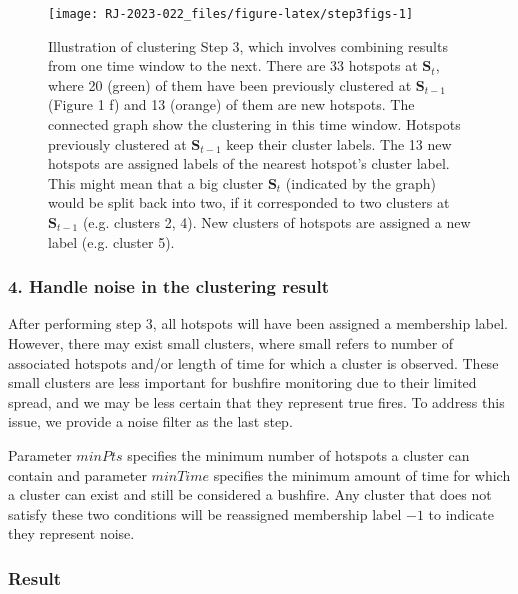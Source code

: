 \begin{figure}

{\centering \texttt{[image: RJ-2023-022\_files/figure-latex/step3figs-1]} 

}

\caption{Illustration of clustering Step 3, which involves combining results from one time window to the next. There are 33 hotspots at $\boldsymbol{S}_t$, where 20 (green) of them have been previously clustered at $\boldsymbol{S}_{t-1}$ (Figure 1 f) and 13 (orange) of them are new hotspots. The connected graph show the clustering in this time window. Hotspots previously clustered at $\boldsymbol{S}_{t-1}$ keep their cluster labels. The 13 new hotspots are assigned labels of the nearest hotspot's cluster label. This might mean that a big cluster $\boldsymbol{S}_t$ (indicated by the graph) would be split back into two, if it corresponded to two clusters at $\boldsymbol{S}_{t-1}$ (e.g. clusters 2, 4). New clusters of hotspots are assigned a new label (e.g. cluster 5).}\label{fig:step3figs}
\end{figure}

\hypertarget{handle-noise-in-the-clustering-result}{%
\subsubsection{4. Handle noise in the clustering result}\label{handle-noise-in-the-clustering-result}}

After performing step 3, all hotspots will have been assigned a membership label. However, there may exist small clusters, where small refers to number of associated hotspots and/or length of time for which a cluster is observed. These small clusters are less important for bushfire monitoring due to their limited spread, and we may be less certain that they represent true fires. To address this issue, we provide a noise filter as the last step.

Parameter \(minPts\) specifies the minimum number of hotspots a cluster can contain and parameter \(minTime\) specifies the minimum amount of time for which a cluster can exist and still be considered a bushfire. Any cluster that does not satisfy these two conditions will be reassigned membership label \(-1\) to indicate they represent noise.

\hypertarget{result}{%
\subsubsection{Result}\label{result}}

